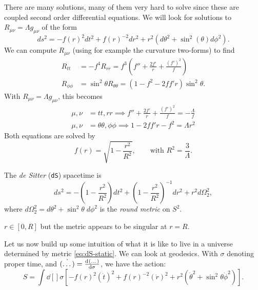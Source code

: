 There are many solutions, many of them very hard to solve since these are coupled second order differential equations. We will look for solutions to $R_{\mu\nu} = \Lambda g_{\mu\nu}$ of the form
\begin{equation}
  \label{eq:14-metric}
  ds^2 = -f(r)^2 dt^2 + f(r)^{-2} dr^2 + r^2 (d\theta^2 + \sin^2(\theta) d\phi^2).
\end{equation}
We can compute $R_{\mu\nu}$ (using for example the curvature two-forms) to find 
\begin{align}
  R_{t t } &= -f^4 R_{rr} = f^3 (f'' + \frac{2f'}{r} + \frac{(f')^2}{f}) \\
  R_{\phi\phi} &= \sin^2\theta R_{\theta\theta} = (1 - f^2 - 2 ff' r) \sin^2\theta.
\end{align}
With $R_{\mu\nu} = \Lambda g_{\mu\nu}$, this becomes
\begin{align}
  \mu,\nu &= t t, r r \implies f'' + \frac{2 f'}{r} + \frac{(f')^2}{f} = -\frac{\Lambda}{f}   \\
  \mu, \nu &= \theta\theta, \phi\phi \implies 1 - 2 ff' r - f^2 = \Lambda r^2
\end{align}
Both equations are solved by
\begin{equation}
  f(r) = \sqrt{1 - \frac{r^2}{R^2}}, \qquad \text{with } R^2 = \frac{3}{\Lambda}.
\end{equation}
\begin{definition}[]
  The \emph{de Sitter} (\texttt{dS}) spacetime is
  \begin{equation}
    \label{eq:dS-static}
    ds^2 = - \left( 1 - \frac{r^2}{R^2} \right) dt^2 + \left( 1 - \frac{r^2}{R^2} \right)^{-1} dr^2 + r^2 d\Omega^2_2,
  \end{equation}
  where $d\Omega^2_2 = d\theta^2 + \sin^2\theta \; d\phi^2$ is the \emph{round metric} on $S^2$.
\end{definition}
\begin{leftbar}
  \begin{remark}
    $r\in [0, R]$ but the metric appears to be singular at $r = R$.
  \end{remark}
\end{leftbar}
Let us now build up some intuition of what it is like to live in a universe determined by metric \eqref{eq:dS-static}.
We can look at geodesics. With $\sigma$ denoting proper time, and $\dot{(\dots)} = \dv[]{(\dots)}{\sigma}$, we have the action:
\begin{equation}
  S = \int \dd[]{\sigma} \left[ -f(r)^2 (\dot t)^2 + f(r)^{-2} (\dot r)^2 + r^2 (\dot \theta^2 + \sin^2 \theta \dot \phi^2) \right].
\end{equation}
